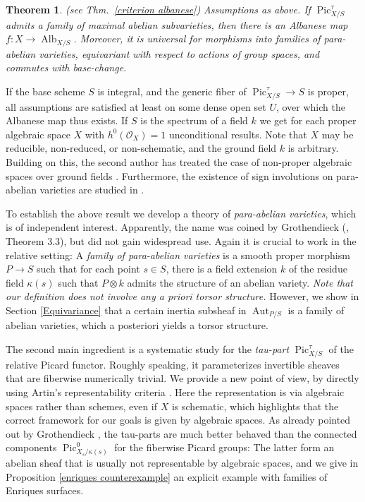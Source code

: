 \documentclass[oneside, 12pt]{amsart}
\newtheorem*{maintheorem}{Theorem}
\theoremstyle{definition}
\theoremstyle{remark}
\newcommand{\Alb}{\operatorname{Alb}}
\newcommand{\Aut}{\operatorname{Aut}}
\renewcommand{\O}{\mathscr{O}}
\newcommand{\Pic}{\operatorname{Pic}}
\newcommand{\ra}{\rightarrow}
\begin{document}
\begin{maintheorem}
{\rm (see Thm.\ \ref{criterion albanese})} 
Assumptions as above. If   $\Pic^\tau_{X/S}$ admits a   family of maximal abelian subvarieties, then 
there is an Albanese map $f:X\ra\Alb_{X/S}$. Moreover, it is universal for morphisms into families of para-abelian varieties,
equivariant with respect to actions of group spaces, and commutes with base-change.
\end{maintheorem}

If the base scheme $S$ is integral, and the generic fiber of $\Pic^\tau_{X/S}\ra S$ is proper,
all assumptions are satisfied at least on some  dense open set $U$, over which the Albanese map
thus exists. If $S$ is   the spectrum of a field $k$ we get for each proper 
algebraic space $X$ with $h^0(\O_X)=1$ unconditional results. Note that $X$ may be reducible, non-reduced, or non-schematic, and the ground field $k$
is arbitrary. 
Building on this, the second author has treated the case of non-proper algebraic spaces over ground fields  
\cite{Schroeer 2022}.  Furthermore, the existence of  sign involutions on para-abelian varieties are studied in   \cite{Bergqvist; Dang; Schroeer 2023}.

To establish the above result we  develop  a theory of \emph{para-abelian varieties}, which is of independent interest.
Apparently, the name was coined by Grothendieck (\cite{FGA VI},  Theorem 3.3), but did not gain widespread use.
Again it is crucial to work in the relative setting: A \emph{family of para-abelian varieties}
is a    smooth proper morphism  $P\ra S$   such that for each point $s\in S$,
there is a field extension $k$ of the residue field $\kappa(s)$ such that $P \otimes k$
admits the structure of an abelian variety. \emph{Note that our definition does not involve any a priori torsor structure.}
However, we   show in Section \ref{Equivariance} that a certain inertia subsheaf in $\Aut_{P/S}$ is 
a family of abelian varieties, which a posteriori yields  a torsor structure.

The second main ingredient is a systematic study for the \emph{tau-part} $\Pic^\tau_{X/S}$ of the relative Picard functor.
Roughly speaking, it parameterizes invertible sheaves that are fiberwise numerically trivial.
We provide a new point of view, by directly using Artin's representability criteria \cite{Artin 1969}.
Here the representation is via algebraic spaces rather than schemes, even if $X$ is schematic, which highlights  that
the correct framework for our goals is given by algebraic spaces.
As already pointed out  by Grothendieck \cite{FGA VI}, the tau-parts are much better behaved than the connected components
$\Pic^0_{X_s/\kappa(s)}$  for the fiberwise Picard groups: The latter form an abelian sheaf that is usually not representable 
by algebraic spaces, and we give in Proposition \ref{enriques counterexample} an explicit example  with families of Enriques surfaces.
\end{document}
